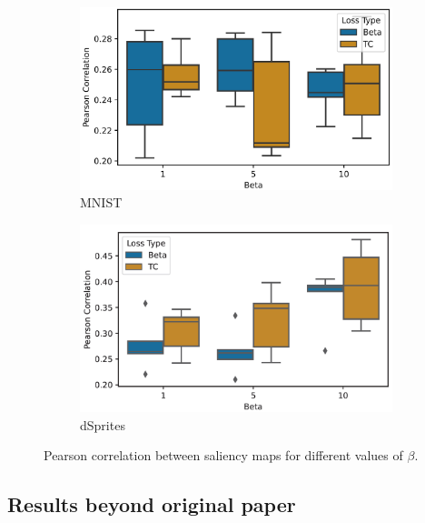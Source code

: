\begin{figure}[H]
     \begin{subfigure}[b]{0.45\textwidth}
         \centering
         \includegraphics[width=\textwidth]{images/PearsonMnist.png}
         \caption{MNIST}
         \label{fig:CIFARpearsonVAE}
     \end{subfigure}
     \hfill
     \begin{subfigure}[b]{0.45\textwidth}
         \centering
         \includegraphics[width=\textwidth]{images/PearsonDsprites.png}
         \caption{dSprites}
         \label{fig:pearson}
     \end{subfigure}
        \caption{Pearson correlation between saliency maps for different values of $\beta$.}
        \label{fig:pearsonVAE}
\end{figure}

\subsection{Results beyond original paper}

